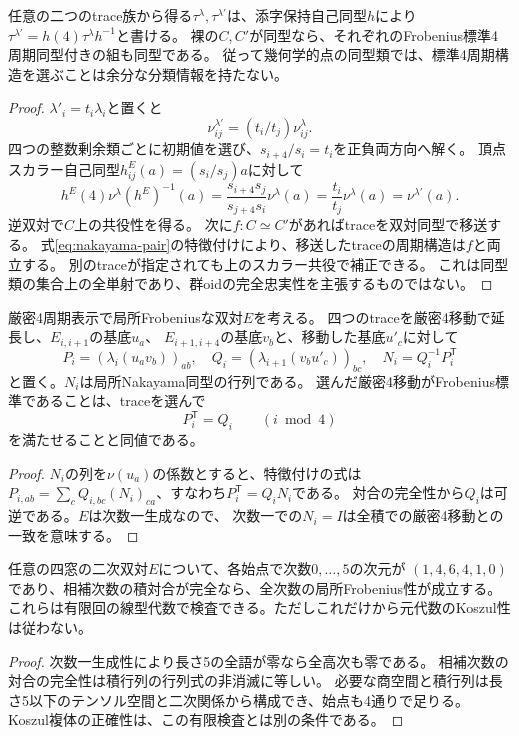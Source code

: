 \begin{theorem}[標準4周期同型の選択独立性]\label{thm:canonical-four}
任意の二つのtrace族から得る$\tau^\lambda,\tau^{\lambda'}$は、添字保持自己同型$h$により
$\tau^{\lambda'}=h(4)\tau^\lambda h^{-1}$と書ける。
裸の$C,C'$が同型なら、それぞれのFrobenius標準4周期同型付きの組も同型である。
従って幾何学的点の同型類では、標準4周期構造を選ぶことは余分な分類情報を持たない。
\end{theorem}
\begin{proof}
$\lambda'_i=t_i\lambda_i$と置くと
\begin{equation}\label{eq:trace-change}
 \nu^{\lambda'}_{ij}=(t_i/t_j)\nu^\lambda_{ij}.
\end{equation}
四つの整数剰余類ごとに初期値を選び、$s_{i+4}/s_i=t_i$を正負両方向へ解く。
頂点スカラー自己同型$h^E_{ij}(a)=(s_i/s_j)a$に対して
\[
 h^E(4)\nu^\lambda(h^E)^{-1}(a)
 =\frac{s_{i+4}s_j}{s_{j+4}s_i}\nu^\lambda(a)
 =\frac{t_i}{t_j}\nu^\lambda(a)=\nu^{\lambda'}(a).
\]
逆双対で$C$上の共役性を得る。
次に$f:C\simeq C'$があればtraceを双対同型で移送する。
式\eqref{eq:nakayama-pair}の特徴付けにより、移送したtraceの周期構造は$f$と両立する。
別のtraceが指定されても上のスカラー共役で補正できる。
これは同型類の集合上の全単射であり、群oidの完全忠実性を主張するものではない。
\end{proof}

\begin{proposition}[有限四窓での標準化]\label{prop:canonical-matrix}
厳密4周期表示で局所Frobeniusな双対$E$を考える。
四つのtraceを厳密4移動で延長し、$E_{i,i+1}$の基底$u_a$、
$E_{i+1,i+4}$の基底$v_b$と、移動した基底$u'_c$に対して
\[
 P_i=(\lambda_i(u_a v_b))_{ab},\quad
 Q_i=(\lambda_{i+1}(v_bu'_c))_{bc},\quad N_i=Q_i^{-1}P_i^{\mathsf T}
\]
と置く。$N_i$は局所Nakayama同型の行列である。
選んだ厳密4移動がFrobenius標準であることは、traceを選んで
\begin{equation}\label{eq:canonical-matrix-test}
 P_i^{\mathsf T}=Q_i\qquad(i\bmod4)
\end{equation}
を満たせることと同値である。
\end{proposition}
\begin{proof}
$N_i$の列を$\nu(u_a)$の係数とすると、特徴付けの式は
$P_{i,ab}=\sum_cQ_{i,bc}(N_i)_{ca}$、すなわち$P_i^{\mathsf T}=Q_iN_i$である。
対合の完全性から$Q_i$は可逆である。$E$は次数一生成なので、
次数一での$N_i=I$は全積での厳密4移動との一致を意味する。
\end{proof}

\begin{proposition}[有限次数のFrobenius検査]\label{prop:finite-frobenius}
任意の四窓の二次双対$E$について、各始点で次数$0,\ldots,5$の次元が
$(1,4,6,4,1,0)$であり、相補次数の積対合が完全なら、全次数の局所Frobenius性が成立する。
これらは有限回の線型代数で検査できる。ただしこれだけから元代数のKoszul性は従わない。
\end{proposition}
\begin{proof}
次数一生成性により長さ5の全語が零なら全高次も零である。
相補次数の対合の完全性は積行列の行列式の非消滅に等しい。
必要な商空間と積行列は長さ5以下のテンソル空間と二次関係から構成でき、始点も4通りで足りる。
Koszul複体の正確性は、この有限検査とは別の条件である。
\end{proof}

